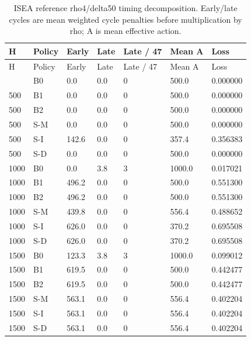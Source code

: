 \documentclass[10pt,a4paper]{article}
\begin{document}
{\scriptsize
\begin{longtable}{@{\extracolsep{\fill}}lllllll}
\caption{ISEA reference rho4/delta50 timing decomposition. Early/late cycles are mean weighted cycle penalties before multiplication by rho; A is mean effective action.}\label{tab:actions_decomposition}\\
\toprule
H & Policy & Early & Late & Late / 47 & Mean A & Loss\\\midrule
\endfirsthead
\toprule
H & Policy & Early & Late & Late / 47 & Mean A & Loss\\\midrule
\endhead
\bottomrule\endfoot
500 & B0 & 0.0 & 0.0 & 0 & 500.0 & 0.000000\\
500 & B1 & 0.0 & 0.0 & 0 & 500.0 & 0.000000\\
500 & B2 & 0.0 & 0.0 & 0 & 500.0 & 0.000000\\
500 & S-M & 0.0 & 0.0 & 0 & 500.0 & 0.000000\\
500 & S-I & 142.6 & 0.0 & 0 & 357.4 & 0.356383\\
500 & S-D & 0.0 & 0.0 & 0 & 500.0 & 0.000000\\
1000 & B0 & 0.0 & 3.8 & 3 & 1000.0 & 0.017021\\
1000 & B1 & 496.2 & 0.0 & 0 & 500.0 & 0.551300\\
1000 & B2 & 496.2 & 0.0 & 0 & 500.0 & 0.551300\\
1000 & S-M & 439.8 & 0.0 & 0 & 556.4 & 0.488652\\
1000 & S-I & 626.0 & 0.0 & 0 & 370.2 & 0.695508\\
1000 & S-D & 626.0 & 0.0 & 0 & 370.2 & 0.695508\\
1500 & B0 & 123.3 & 3.8 & 3 & 1000.0 & 0.099012\\
1500 & B1 & 619.5 & 0.0 & 0 & 500.0 & 0.442477\\
1500 & B2 & 619.5 & 0.0 & 0 & 500.0 & 0.442477\\
1500 & S-M & 563.1 & 0.0 & 0 & 556.4 & 0.402204\\
1500 & S-I & 563.1 & 0.0 & 0 & 556.4 & 0.402204\\
1500 & S-D & 563.1 & 0.0 & 0 & 556.4 & 0.402204\\
\end{longtable}}




\end{document}
